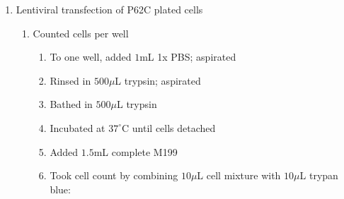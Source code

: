 \begin{enumerate}
	\item Lentiviral transfection of P62C plated cells
		\begin{enumerate}
			\item Counted cells per well
				\begin{enumerate}
					\item To one well, added $1$mL 1x PBS; aspirated
					\item Rinsed in $500\mu$L trypsin; aspirated
					\item Bathed in $500\mu$L trypsin
					\item Incubated at $37^{\circ}$C until cells detached
					\item Added $1.5$mL complete M199
					\item Took cell count by combining $10\mu$L cell mixture with $10\mu$L trypan blue:
			

\end{enumerate}
\end{enumerate}
\end{enumerate}

